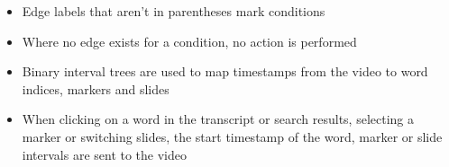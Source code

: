 \documentclass{article}
\begin{document}
\vspace{2em}

\begin{itemize}
    \item Edge labels that aren't in parentheses mark conditions
    \item Where no edge exists for a condition, no action is performed
    \item Binary interval trees are used to map timestamps from the video to word indices, markers and slides
    \item When clicking on a word in the transcript or search results, selecting a marker or switching slides, the start timestamp of the word, marker or slide intervals are sent to the video
\end{itemize}
\end{document}
